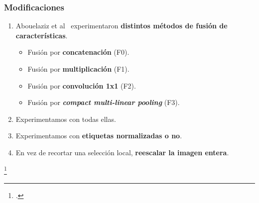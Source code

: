 \begin{frame}
  \frametitle{Modificaciones}
  \begin{enumerate}
    \item Abouelaziz et al\footnotemark~ experimentaron \textbf{distintos métodos de fusión de características}.
      \begin{itemize}
        \item Fusión por \textbf{concatenación} (F0).
        \item Fusión por \textbf{multiplicación} (F1). 
        \item Fusión por \textbf{convolución 1x1} (F2).
        \item Fusión por \textbf{\emph{compact multi-linear pooling}} (F3).
      \end{itemize}
    \item Experimentamos con todas ellas.
    \item Experimentamos con \textbf{etiquetas normalizadas o no}.
    \item En vez de recortar una selección local, \textbf{reescalar la imagen entera}.
  \end{enumerate}
  \footcitetext{EnsemblePCQA}
\end{frame}

